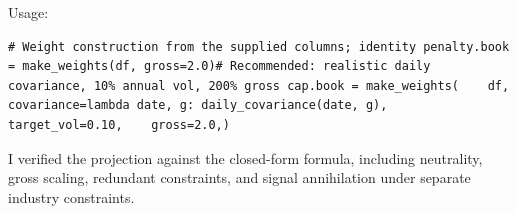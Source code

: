 Usage:

\begin{verbatim}
# Weight construction from the supplied columns; identity penalty.book = make_weights(df, gross=2.0)# Recommended: realistic daily covariance, 10% annual vol, 200% gross cap.book = make_weights(    df,    covariance=lambda date, g: daily_covariance(date, g),    target_vol=0.10,    gross=2.0,)
\end{verbatim}

I verified the projection against the closed-form formula, including neutrality, gross scaling, redundant constraints, and signal annihilation under separate industry constraints.
